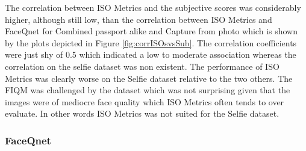 \noindent
The correlation between ISO Metrics and the subjective scores was considerably higher, although still low, than the correlation between ISO Metrics and FaceQnet for Combined passport alike and Capture from photo which is shown by the plots depicted in Figure \ref{fig:corrISOsvsSub}. The correlation coefficients were just shy of 0.5 which indicated a low to moderate association whereas the correlation on the selfie dataset was non existent. The performance of ISO Metrics was clearly worse on the Selfie dataset relative to the two others. The FIQM was challenged by the dataset which was not surprising given that the images were of mediocre face quality which ISO Metrics often tends to over evaluate. In other words ISO Metrics was not suited for the Selfie dataset.  

\subsubsection{FaceQnet}
